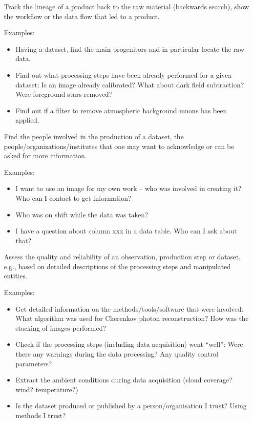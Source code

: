         Track the lineage of a product back to the raw material (backwards search), show the
        workflow or the data flow that led to a product.

        \noindent Examples: 
        \begin{itemize}
            \item Having a dataset, find the main progenitors and in particular locate the raw data.
            \item Find out what processing steps have been already performed for a given dataset: Is an image already calibrated? What about dark field subtraction? Were foreground stars removed?
            \item Find out if a filter to remove atmospheric background muons has been applied.
        \end{itemize}


        Find the people involved in the production of a dataset, the people\slash{}organizations\slash{}institutes that one may want to acknowledge or can be asked for more information.

        \noindent Examples: 
        \begin{itemize}
            \item I want to use an image for my own work -- who was involved in creating it? Who can I contact to get information? 
            \item Who was on shift while the data was taken?
            \item I have a question about column xxx in a data table. Who can I ask about that? 
        \end{itemize}


Assess the quality and reliability of an observation, production step or dataset, e.g., based on detailed descriptions of the processing steps and manipulated entities.
        
        \noindent Examples:
        \begin{itemize}
            \item Get detailed information on the methods/tools/software that were involved: What algorithm was used for Cherenkov photon reconstruction? How was the stacking of images performed?
            \item Check if the processing steps (including data acquisition) went ``well'': Were there any warnings during the data processing? Any quality control parameters?
            \item Extract the ambient conditions during data acquisition (cloud coverage? wind? temperature?)
            \item Is the dataset produced or published by a person/organisation I trust? Using methods I trust?
        \end{itemize}


